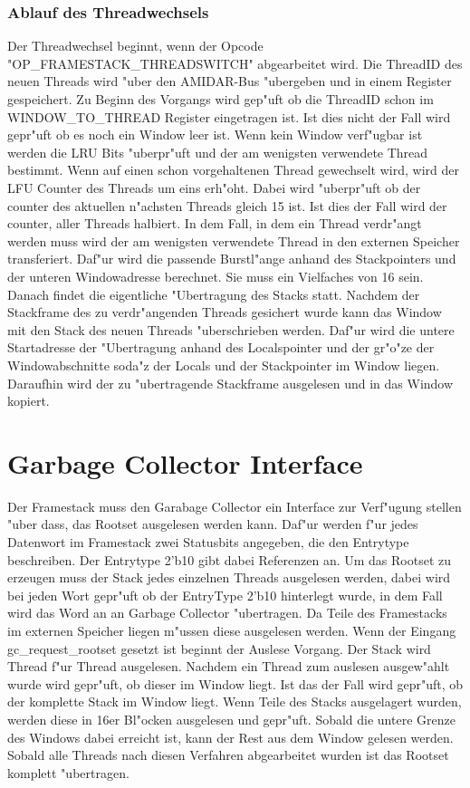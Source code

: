 \subsubsection{Ablauf des Threadwechsels}
Der Threadwechsel beginnt, wenn der Opcode "OP\_FRAMESTACK\_THREADSWITCH" abgearbeitet wird. Die ThreadID des neuen Threads wird "uber den AMIDAR-Bus "ubergeben und in einem Register gespeichert. Zu Beginn des Vorgangs wird gep"uft ob die ThreadID schon im WINDOW\_TO\_THREAD Register eingetragen ist. Ist dies nicht der Fall wird gepr"uft ob es noch ein Window leer ist. 
Wenn kein Window verf"ugbar ist werden die LRU Bits "uberpr"uft und der am wenigsten verwendete Thread bestimmt. Wenn auf einen schon vorgehaltenen Thread gewechselt wird, wird der LFU Counter des Threads um eins erh"oht. Dabei wird "uberpr"uft ob der counter des aktuellen n"achsten Threads gleich 15 ist. Ist dies der Fall wird der counter, aller Threads halbiert. 
In dem Fall, in dem ein Thread verdr"angt werden muss wird der am wenigsten verwendete Thread in den externen Speicher transferiert. Daf"ur wird die passende Burstl"ange anhand des Stackpointers und der unteren Windowadresse berechnet. Sie muss ein Vielfaches von 16 sein. Danach findet die eigentliche "Ubertragung des Stacks statt. 
Nachdem der Stackframe des zu verdr"angenden Threads gesichert wurde kann das Window mit den Stack des neuen Threads "uberschrieben werden. Daf"ur wird die untere Startadresse der "Ubertragung anhand des Localspointer und der gr"o"ze der Windowabschnitte soda"z der Locals und der Stackpointer im Window liegen. Daraufhin wird der zu "ubertragende Stackframe ausgelesen und in das Window kopiert.  

\section{Garbage Collector Interface}

Der Framestack muss den Garabage Collector ein Interface zur Verf"ugung stellen "uber dass, das Rootset ausgelesen werden kann. Daf"ur werden f"ur jedes Datenwort im Framestack zwei Statusbits angegeben, die den Entrytype beschreiben. Der Entrytype 2'b10 gibt dabei Referenzen an. Um das Rootset zu erzeugen muss der Stack jedes einzelnen Threads ausgelesen werden, dabei wird bei jeden Wort gepr"uft ob der EntryType 2'b10 hinterlegt wurde, in dem Fall wird das Word an an Garbage Collector "ubertragen. Da Teile des Framestacks im externen Speicher liegen m"ussen diese ausgelesen werden.
Wenn der Eingang gc\_request\_rootset gesetzt ist beginnt der Auslese Vorgang. Der Stack wird Thread f"ur Thread ausgelesen. Nachdem ein Thread zum auslesen ausgew"ahlt wurde wird gepr"uft, ob dieser im Window liegt. Ist das der Fall wird gepr"uft, ob der komplette Stack im Window liegt. Wenn Teile des Stacks ausgelagert wurden, werden diese in 16er Bl"ocken ausgelesen und gepr"uft. Sobald die untere Grenze des Windows dabei erreicht ist, kann der Rest aus dem Window gelesen werden. Sobald alle Threads nach diesen Verfahren abgearbeitet wurden ist das Rootset komplett "ubertragen. 

